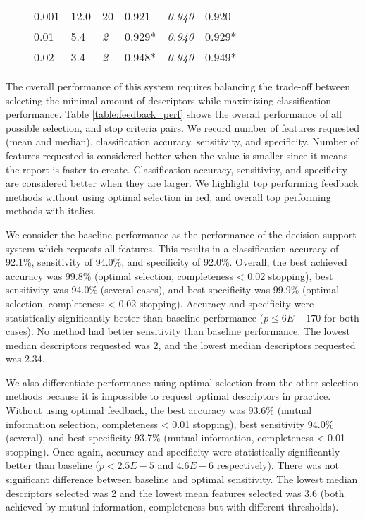 \begin{table}[h]
\begin{tabularx}{\textwidth}{|X|X|X|X|X|X|X|X|}
		&                          & 0.001     & 12.0          & 20               & 0.921          & \textit{0.940}       & 0.920          \\ \cline{3-8} 
		&                          & 0.01      & 5.4           & \textit{2}       & 0.929*          & \textit{0.940}       & 0.929*          \\ \cline{3-8} 
		&                          & 0.02      & 3.4           & \textit{2}       & 0.948*          & \textit{0.940}       & 0.949*          \\ \hline 
	\end{tabularx}
\end{table}

The overall performance of this system requires balancing the trade-off between selecting the minimal amount of descriptors while maximizing classification performance.
Table \ref{table:feedback_perf} shows the overall performance of all possible selection, and stop criteria pairs.
We record number of features requested (mean and median), classification accuracy, sensitivity, and specificity.
Number of features requested is considered better when the value is smaller since it means the report is faster to create.
Classification accuracy, sensitivity, and specificity are considered better when they are larger.
We highlight top performing feedback methods without using optimal selection in red, and overall top performing methods with italics.

We consider the baseline performance as the performance of the decision-support system which requests all features.
This results in a classification accuracy of 92.1\%, sensitivity of 94.0\%, and specificity of 92.0\%.
Overall, the best achieved accuracy was 99.8\% (optimal selection, completeness < 0.02 stopping), best sensitivity was 94.0\% (several cases), and best specificity was 99.9\% (optimal selection, completeness < 0.02 stopping).
Accuracy and specificity were statistically significantly better than baseline performance ($p\le6E-170$ for both cases).
No method had better sensitivity than baseline performance.
The lowest median descriptors requested was 2, and the lowest median descriptors requested was 2.34.

We also differentiate performance using optimal selection from the other selection methods because it is impossible to request optimal descriptors in practice.
Without using optimal feedback, the best accuracy was 93.6\% (mutual information selection, completeness < 0.01 stopping), best sensitivity 94.0\% (several), and best specificity 93.7\% (mutual information, completeness < 0.01 stopping).
Once again, accuracy and specificity were statistically significantly better than baseline ($p<2.5E-5$ and $4.6E-6$ respectively).
There was not significant difference between baseline and optimal sensitivity.
The lowest median descriptors selected was 2 and the lowest mean features selected was 3.6 (both achieved by mutual information, completeness but with different thresholds).








